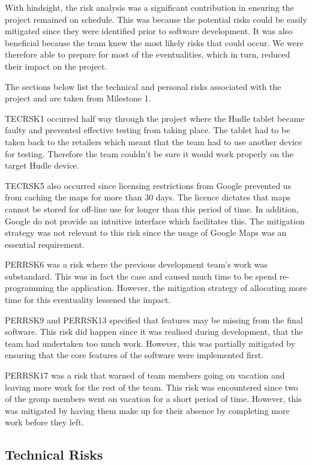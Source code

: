 \documentclass[11pt,a4paper]{report}
\begin{document}
With hindsight, the risk analysis was a significant contribution in ensuring the project remained on schedule. This was because the potential risks could be easily mitigated since they were identified prior to software development. It was also beneficial because the team knew the most likely risks that could occur. We were therefore able to prepare for most of the eventualities, which in turn, reduced their impact on the project.

The sections below list the technical and personal risks associated with the project and are taken from Milestone 1\cite{milestone1}. 

TECRSK1 occurred half way through the project where the Hudle tablet became faulty and prevented effective testing from taking place. The tablet had to be taken back to the retailers which meant that the team had to use another device for testing. Therefore the team couldn't be sure it would work properly on the target Hudle device.

TECRSK5 also occurred since licensing restrictions from Google prevented us from caching the maps for more than 30 days. The licence dictates that maps cannot be stored for off-line use for longer than this period of time. In addition, Google do not provide an intuitive interface which facilitates this. The mitigation strategy was not relevant to this risk since the usage of Google Maps was an essential requirement.

PERRSK6 was a risk where the previous development team's work was substandard. This was in fact the case and caused much time to be spend re-programming the application. However, the mitigation strategy of allocating more time for this eventuality lessened the impact.

PERRSK9 and PERRSK13 specified that features may be missing from the final software. This risk did happen since it was realised during development, that the team had undertaken too much work. However, this was partially mitigated by ensuring that the core features of the software were implemented first.

PERRSK17 was a risk that warned of team members going on vacation and leaving more work for the rest of the team. This risk was encountered since two of the group members went on vacation for a short period of time. However, this was mitigated by having them make up for their absence by completing more work before they left.

\subsection*{Technical Risks}
\end{document}
